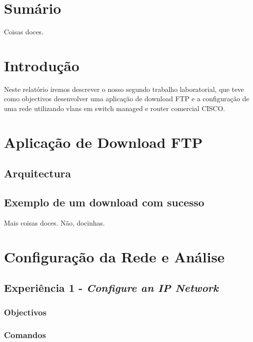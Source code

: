 \documentclass[a4paper,11pt]{article}
\begin{document}

\newpage
\section{Sumário}
Coisas doces.

\section{Introdução}
Neste relatório iremos descrever o nosso segundo trabalho laboratorial, que teve como objectivos desenvolver uma aplicação de download FTP e a configuração de uma rede utilizando vlans em switch managed e router comercial CISCO.

\section{Aplicação de Download FTP}
\subsection{Arquitectura}

\subsection{Exemplo de um download com sucesso}
Mais coisas doces. Não, docinhas.

\section{Configuração da Rede e Análise }
\subsection{Experiência 1 - \textit{Configure an IP Network}}
\subsubsection{Objectivos}

\subsubsection{Comandos}
\end{document}
